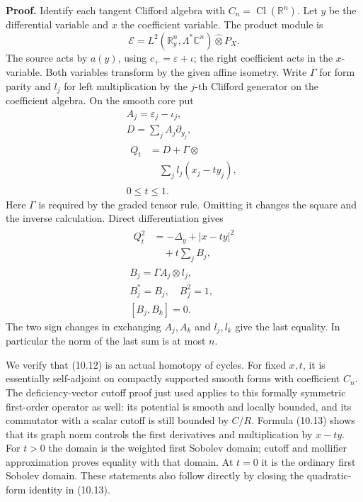 \documentclass[
  11pt,
]{article}
\begin{document}
\textbf{Proof.} Identify each tangent Clifford algebra with
\(C_n=\operatorname{Cl}(\mathbb R^n)\). Let \(y\) be the differential
variable and \(x\) the coefficient variable. The product module is \[
\mathcal E=L^2(\mathbb R^n_y,\Lambda^*\mathbb C^n)
\widehat\otimes P_X.
\tag{10.11}
\] The source acts by \(a(y)\), using \(c_+=\varepsilon+\iota\); the
right coefficient acts in the \(x\)-variable. Both variables transform
by the given affine isometry. Write \(\Gamma\) for form parity and
\(l_j\) for left multiplication by the \(j\)-th Clifford generator on
the coefficient algebra. On the smooth core put \[
\begin{gathered}
A_j=\varepsilon_j-\iota_j,\\
D=\sum_j A_j\partial_{y_j},\\
\begin{aligned}
Q_t&=D+\Gamma\otimes\\
&\quad\sum_j l_j(x_j-t y_j),
\end{aligned}\\
0\leq t\leq1.
\end{gathered}
\tag{10.12}
\] Here \(\Gamma\) is required by the graded tensor rule. Omitting it
changes the square and the inverse calculation. Direct differentiation
gives \[
\begin{gathered}
\begin{aligned}
Q_t^2&=-\Delta_y+|x-t y|^2\\
&\quad+t\sum_j B_j,
\end{aligned}\\
B_j=\Gamma A_j\otimes l_j,\\
B_j^*=B_j,\quad B_j^2=1,\\
[B_j,B_k]=0.
\end{gathered}
\tag{10.13}
\] The two sign changes in exchanging \(A_j,A_k\) and \(l_j,l_k\) give
the last equality. In particular the norm of the last sum is at most
\(n\).

We verify that (10.12) is an actual homotopy of cycles. For fixed
\(x,t\), it is essentially self-adjoint on compactly supported smooth
forms with coefficient \(C_n\). The deficiency-vector cutoff proof just
used applies to this formally symmetric first-order operator as well:
its potential is smooth and locally bounded, and its commutator with a
scalar cutoff is still bounded by \(C/R\). Formula (10.13) shows that
its graph norm controls the first derivatives and multiplication by
\(x-t y\). For \(t>0\) the domain is the weighted first Sobolev domain;
cutoff and mollifier approximation proves equality with that domain. At
\(t=0\) it is the ordinary first Sobolev domain. These statements also
follow directly by closing the quadratic-form identity in (10.13).
\end{document}
